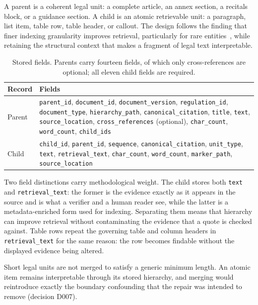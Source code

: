 A parent is a coherent legal unit: a complete article, an annex section, a recitals block, or a guidance section. A child is an atomic retrievable unit: a paragraph, list item, table row, table header, or callout. The design follows the finding that finer indexing granularity improves retrieval, particularly for rare entities~\cite{chen2024densex}, while retaining the structural context that makes a fragment of legal text interpretable.

\begin{table}[htbp]
  \centering
  \caption{Stored fields. Parents carry fourteen fields, of which only cross-references are optional; all eleven child fields are required.}
  \label{tab:schema-fields}
  \small
  \begin{tabularx}{\textwidth}{@{}l X@{}}
    \toprule
    \textbf{Record} & \textbf{Fields} \\
    \midrule
    Parent &
      \texttt{parent\_id}, \texttt{document\_id}, \texttt{document\_version}, \texttt{regulation\_id},
      \texttt{document\_type}, \texttt{hierarchy\_path}, \texttt{canonical\_citation}, \texttt{title},
      \texttt{text}, \texttt{source\_location}, \texttt{cross\_references} (optional),
      \texttt{char\_count}, \texttt{word\_count}, \texttt{child\_ids} \\
    \addlinespace
    Child &
      \texttt{child\_id}, \texttt{parent\_id}, \texttt{sequence}, \texttt{canonical\_citation},
      \texttt{unit\_type}, \texttt{text}, \texttt{retrieval\_text}, \texttt{char\_count},
      \texttt{word\_count}, \texttt{marker\_path}, \texttt{source\_location} \\
    \bottomrule
  \end{tabularx}
\end{table}

Two field distinctions carry methodological weight. The child stores both \texttt{text} and \texttt{retrieval\_text}: the former is the evidence exactly as it appears in the source and is what a verifier and a human reader see, while the latter is a metadata-enriched form used for indexing. Separating them means that hierarchy can improve retrieval without contaminating the evidence that a quote is checked against. Table rows repeat the governing table and column headers in \texttt{retrieval\_text} for the same reason: the row becomes findable without the displayed evidence being altered.

Short legal units are not merged to satisfy a generic minimum length. An atomic item remains interpretable through its stored hierarchy, and merging would reintroduce exactly the boundary confounding that the repair was intended to remove (decision D007).


